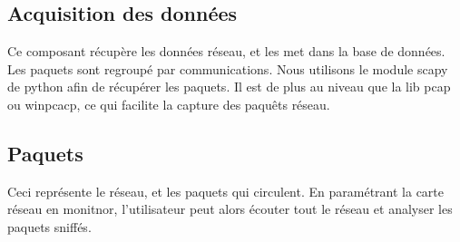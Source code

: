 \subsection{Acquisition des données}
Ce composant récupère les données réseau, et les met dans la base de données. Les paquets sont regroupé par communications.
Nous utilisons le module scapy de python afin de récupérer les paquets. Il est de plus au niveau que la lib pcap ou winpcacp, ce qui facilite la capture des paquêts réseau.

\subsection{Paquets}
Ceci représente le réseau, et les paquets qui circulent. En paramétrant la carte réseau en monitnor, l'utilisateur peut alors écouter tout le réseau et analyser les paquets sniffés.


